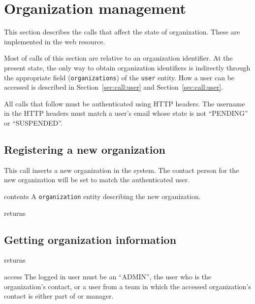 \section{Organization management}
\label{sec:call:organization}

This section describes the calls that affect the state of organization. These
are implemented in the
web resource.

Most of calls of this section are relative to an organization identifier. At the
present state, the only way to obtain organization identifiers is indirectly
through the appropriate field (\texttt{organizations}) of the \texttt{user}
entity. How a user can be accessed is described in Section~\ref{sec:call:user}
and Section~\ref{sec:call:user}. 

All calls that follow must be authenticated using HTTP headers. The username in
the HTTP headers must match a user's email whose state is not ``PENDING'' or
``SUSPENDED''.


\subsection{Registering a new organization}

This call inserts a new organization in the system. The contact person for the
new organization will be set to match the authenticated user.

\begin{apidata}{contents}
  A \texttt{organization} entity describing the new organization.
\end{apidata}
\begin{apidata}{returns}
  \begin{datalist}
  \end{datalist}
\end{apidata}


\subsection{Getting organization information}

\begin{apidata}{returns}
  \begin{datalist}
  \end{datalist}
\end{apidata}
\begin{apidata}{access}
The logged in user must be an ``ADMIN'', the user who is the organization's
contact, or a user from a team in which the accessed organization's contact is
either part of or manager.
\end{apidata}


